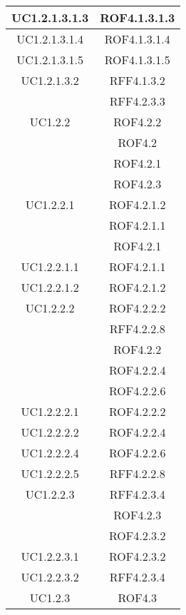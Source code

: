 \begin{longtable}{|c|c|}
\midrule
UC1.2.1.3.1.3
& ROF4.1.3.1.3\\

\midrule
UC1.2.1.3.1.4
& ROF4.1.3.1.4\\

\midrule
UC1.2.1.3.1.5
& ROF4.1.3.1.5\\

\midrule
UC1.2.1.3.2
& RFF4.1.3.2\\
& RFF4.2.3.3\\

\midrule
UC1.2.2
& ROF4.2.2\\
& ROF4.2\\
& ROF4.2.1\\
& ROF4.2.3\\

\midrule
UC1.2.2.1
& ROF4.2.1.2\\
& ROF4.2.1.1\\
& ROF4.2.1\\

\midrule
UC1.2.2.1.1
& ROF4.2.1.1\\

\midrule
UC1.2.2.1.2
& ROF4.2.1.2\\

\midrule
UC1.2.2.2
& ROF4.2.2.2\\
& RFF4.2.2.8\\
& ROF4.2.2\\
& ROF4.2.2.4\\
& ROF4.2.2.6\\

\midrule
UC1.2.2.2.1
& ROF4.2.2.2\\

\midrule
UC1.2.2.2.2
& ROF4.2.2.4\\

\midrule
UC1.2.2.2.4
& ROF4.2.2.6\\

\midrule
UC1.2.2.2.5
& RFF4.2.2.8\\

\midrule
UC1.2.2.3
& RFF4.2.3.4\\
& ROF4.2.3\\
& ROF4.2.3.2\\

\midrule
UC1.2.2.3.1
& ROF4.2.3.2\\

\midrule
UC1.2.2.3.2
& RFF4.2.3.4\\

\midrule
UC1.2.3
& ROF4.3\\


\end{longtable}
